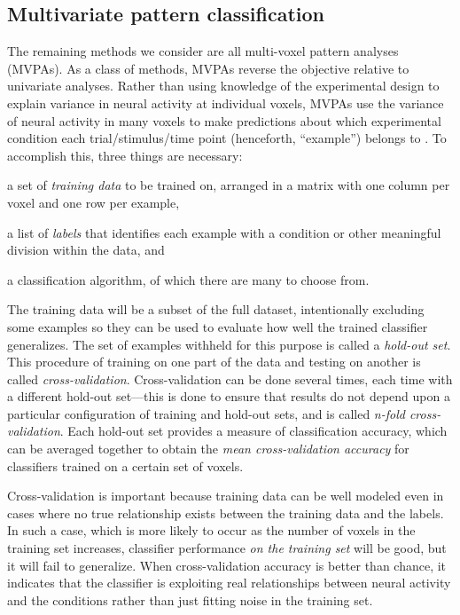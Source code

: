 \subsection{Multivariate pattern classification}

The remaining methods we consider are all multi-voxel pattern analyses (MVPAs). As a class of methods, MVPAs reverse the objective relative to univariate analyses. Rather than using knowledge of the experimental design to explain variance in neural activity at individual voxels, MVPAs use the variance of neural activity in many voxels to 
make predictions about which experimental condition each trial/stimulus/time point (henceforth, ``example'') belongs to \cite{mitchell_learning_2004, pereira_machine_2009}. To accomplish this, three things are necessary: 
\begin{seriate}
  \item a set of {\em training data} to be trained on, arranged in a matrix with one column per voxel and one row per example,
  \item a list of {\em labels} that identifies each example with a condition or other meaningful division within the data, and
  \item a classification algorithm, of which there are many to choose from.
\end{seriate}
The training data will be a subset of the full dataset, intentionally excluding some examples so they can be used to evaluate how well the trained classifier generalizes. The set of examples withheld for this purpose is called a {\em hold-out set}. This procedure of training on one part of the data and testing on another is called {\em cross-validation}. Cross-validation can be done several times, each time with a different hold-out set---this is done to ensure that results do not depend upon a particular configuration of training and hold-out sets, and is called {\em n-fold cross-validation}. Each hold-out set provides a measure of classification accuracy, which can be averaged together to obtain the {\em mean cross-validation accuracy} for classifiers trained on a certain set of voxels.  

Cross-validation is important because training data can be well modeled even in cases where no true relationship exists between the training data and the labels. In such a case, which is more likely to occur as the number of voxels in the training set increases, classifier performance {\em on the training set} will be good, but it will fail to generalize.  When cross-validation accuracy is better than chance, it indicates that the classifier is exploiting real relationships between neural activity and the conditions rather than just fitting noise in the training set.
 
